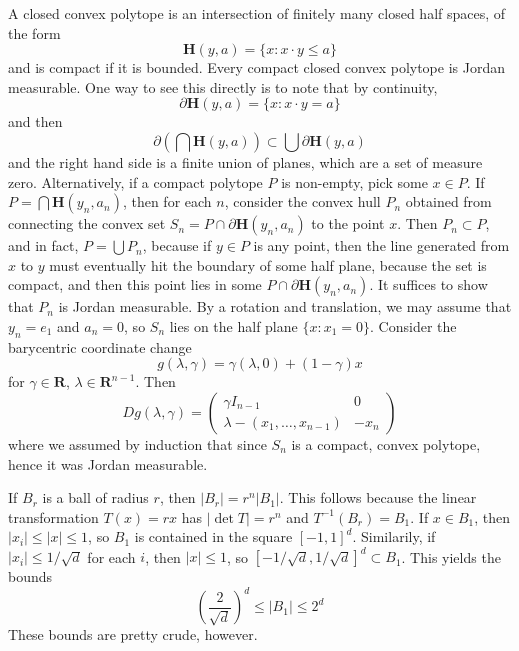 \begin{example}
  A closed convex polytope is an intersection of finitely many closed half spaces, of the form
  \[ \mathbf{H}(y,a) = \{ x: x \cdot y \leq a \} \]
  and is compact if it is bounded. Every compact closed convex polytope is Jordan measurable. One way to see this directly is to note that by continuity,
  \[ \partial \mathbf{H}(y,a) = \{ x: x \cdot y = a \} \]
  and then
  \[ \partial \left(\bigcap \mathbf{H}(y,a)\right) \subset \bigcup \partial \mathbf{H}(y,a) \]
  and the right hand side is a finite union of planes, which are a set of measure zero. Alternatively, if a compact polytope $P$ is non-empty, pick some $x \in P$. If $P = \bigcap \mathbf{H}(y_n,a_n)$, then for each $n$, consider the convex hull $P_n$ obtained from connecting the convex set $S_n = P \cap \partial \mathbf{H}(y_n,a_n)$ to the point $x$. Then $P_n \subset P$, and in fact, $P = \bigcup P_n$, because if $y \in P$ is any point, then the line generated from $x$ to $y$ must eventually hit the boundary of some half plane, because the set is compact, and then this point lies in some $P \cap \partial \mathbf{H}(y_n,a_n)$. It suffices to show that $P_n$ is Jordan measurable. By a rotation and translation, we may assume that $y_n = e_1$ and $a_n = 0$, so $S_n$ lies on the half plane $\{ x : x_1 = 0 \}$. Consider the barycentric coordinate change
  \[ g(\lambda, \gamma) = \gamma (\lambda, 0) + (1 - \gamma) x \]
  for $\gamma \in \mathbf{R}$, $\lambda \in \mathbf{R}^{n-1}$. Then
  \[ Dg(\lambda, \gamma) = \begin{pmatrix} \gamma I_{n-1} & 0 \\ \lambda - (x_1,\dots,x_{n-1}) & -x_n \end{pmatrix} \]
  where we assumed by induction that since $S_n$ is a compact, convex polytope, hence it was Jordan measurable.
\end{example}

\begin{example}
  If $B_r$ is a ball of radius $r$, then $|B_r| = r^n |B_1|$. This follows because the linear transformation $T(x) = rx$ has $|\det T| = r^n$ and $T^{-1}(B_r) = B_1$. If $x \in B_1$, then $|x_i| \leq |x| \leq 1$, so $B_1$ is contained in the square $[-1,1]^d$. Similarily, if $|x_i| \leq 1/\sqrt{d}$ for each $i$, then $|x| \leq 1$, so $[-1/\sqrt{d},1/\sqrt{d}]^d \subset B_1$. This yields the bounds
  \[ \left( \frac{2}{\sqrt{d}} \right)^d \leq |B_1| \leq 2^d \]
  These bounds are pretty crude, however.
\end{example}

